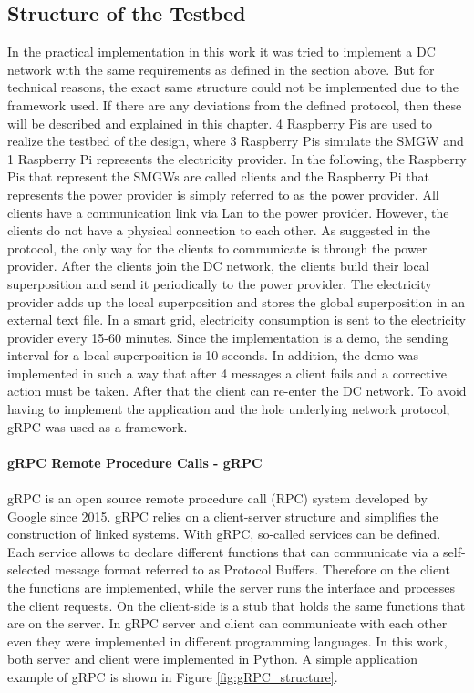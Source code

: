 \subsection{Structure of the Testbed}
In the practical implementation in this work it was tried to implement a DC network with the same requirements as defined in the section above. But for technical reasons, the exact same structure could not be implemented due to the framework used. If there are any deviations from the defined protocol, then these will be described and explained in this chapter.
4 Raspberry Pis are used to realize the testbed of the design, where 3 Raspberry Pis simulate the SMGW and 1 Raspberry Pi represents the electricity provider. In the following, the Raspberry Pis that represent the SMGWs are called clients and the Raspberry Pi that represents the power provider is simply referred to as the power provider. All clients have a communication link via Lan to the power provider. However, the clients do not have a physical connection to each other. As suggested in the protocol, the only way for the clients to communicate is through the power provider. After the clients join the DC network, the clients build their local superposition and send it periodically to the power provider. The electricity provider adds up the local superposition and stores the global superposition in an external text file. In a smart grid, electricity consumption is sent to the electricity provider every 15-60 minutes. Since the implementation is a demo, the sending interval for a local superposition is 10 seconds. In addition, the demo was implemented in such a way that after 4 messages a client fails and a corrective action must be taken. After that the client can re-enter the DC network. To avoid having to implement the application and the hole underlying network protocol, gRPC was used as a framework.\\
\\
\textbf{gRPC Remote Procedure Calls - gRPC}
\\
\\
gRPC is an open source remote procedure call (RPC) system developed by Google since 2015. gRPC relies on a client-server structure and simplifies the construction of linked systems. With gRPC, so-called services can be defined. Each service allows to declare different functions that can communicate via a self-selected message format referred to as Protocol Buffers. Therefore on the client the functions are implemented, while the server runs the interface and processes the client requests. On the client-side is a stub that holds the same functions that are on the server. In gRPC server and client can communicate with each other even they were implemented in different programming languages. In this work, both server and client were implemented in Python. A simple application example of gRPC is shown in Figure \ref{fig:gRPC_structure}.
